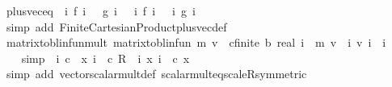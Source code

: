 \begin{isabellebody}
\isanewline
{}\isamarkupfalse%
\ plus{\isacharunderscore}{\kern0pt}vec{\isacharunderscore}{\kern0pt}eq{\isacharcolon}{\kern0pt}\ {\isachardoublequoteopen}{\isacharparenleft}{\kern0pt}{\isasymchi}\ i{\isachardot}{\kern0pt}\ f\ i\ \ {\isacharplus}{\kern0pt}\ g\ i{\isacharparenright}{\kern0pt}\ {\isacharequal}{\kern0pt}\ {\isacharparenleft}{\kern0pt}{\isasymchi}\ i{\isachardot}{\kern0pt}\ f\ i{\isacharparenright}{\kern0pt}\ {\isacharplus}{\kern0pt}\ {\isacharparenleft}{\kern0pt}{\isasymchi}\ i{\isachardot}{\kern0pt}\ g\ i{\isacharparenright}{\kern0pt}{\isachardoublequoteclose}\isanewline
%
\isadelimproof
\ \ %
\endisadelimproof
%
\isatagproof
{}\isamarkupfalse%
\ {\isacharparenleft}{\kern0pt}simp\ add{\isacharcolon}{\kern0pt}\ Finite{\isacharunderscore}{\kern0pt}Cartesian{\isacharunderscore}{\kern0pt}Product{\isachardot}{\kern0pt}plus{\isacharunderscore}{\kern0pt}vec{\isacharunderscore}{\kern0pt}def{\isacharparenright}{\kern0pt}%
\endisatagproof
{\isafoldproof}%
%
\isadelimproof
\isanewline
%
\endisadelimproof
\isanewline
{}\isamarkupfalse%
\ matrix{\isacharunderscore}{\kern0pt}to{\isacharunderscore}{\kern0pt}blinfun{\isacharunderscore}{\kern0pt}mult{\isacharcolon}{\kern0pt}\ {\isachardoublequoteopen}matrix{\isacharunderscore}{\kern0pt}to{\isacharunderscore}{\kern0pt}blinfun\ m\ {\isacharparenleft}{\kern0pt}v\ {\isacharcolon}{\kern0pt}{\isacharcolon}{\kern0pt}\ {\isacharprime}{\kern0pt}c{\isacharcolon}{\kern0pt}{\isacharcolon}{\kern0pt}finite\ {\isasymRightarrow}\isactrlsub b\ real{\isacharparenright}{\kern0pt}\ i\ {\isacharequal}{\kern0pt}\ {\isacharparenleft}{\kern0pt}m\ {\isacharasterisk}{\kern0pt}v\ {\isacharparenleft}{\kern0pt}{\isasymchi}\ i{\isachardot}{\kern0pt}\ v\ i{\isacharparenright}{\kern0pt}{\isacharparenright}{\kern0pt}\ {\isachardollar}{\kern0pt}\ i{\isachardoublequoteclose}\isanewline
%
\isadelimproof
%
\endisadelimproof
%
\isatagproof
{}\isamarkupfalse%
\ {\isacharminus}{\kern0pt}\isanewline
\ \ \isamarkupfalse%
\ {\isacharbrackleft}{\kern0pt}simp{\isacharbrackright}{\kern0pt}{\isacharcolon}{\kern0pt}\ {\isachardoublequoteopen}{\isacharparenleft}{\kern0pt}{\isasymchi}\ i{\isachardot}{\kern0pt}\ c\ {\isacharasterisk}{\kern0pt}\ x\ i{\isacharparenright}{\kern0pt}\ {\isacharequal}{\kern0pt}\ c\ {\isacharasterisk}{\kern0pt}\isactrlsub R\ {\isacharparenleft}{\kern0pt}{\isasymchi}\ i{\isachardot}{\kern0pt}\ x\ i{\isacharparenright}{\kern0pt}{\isachardoublequoteclose}\ \ c\ x\isanewline
\ \ \ \ \isamarkupfalse%
\ {\isacharparenleft}{\kern0pt}simp\ add{\isacharcolon}{\kern0pt}\ vector{\isacharunderscore}{\kern0pt}scalar{\isacharunderscore}{\kern0pt}mult{\isacharunderscore}{\kern0pt}def\ scalar{\isacharunderscore}{\kern0pt}mult{\isacharunderscore}{\kern0pt}eq{\isacharunderscore}{\kern0pt}scaleR{\isacharbrackleft}{\kern0pt}symmetric{\isacharbrackright}{\kern0pt}{\isacharparenright}{\kern0pt}\isanewline

\end{isabellebody}
